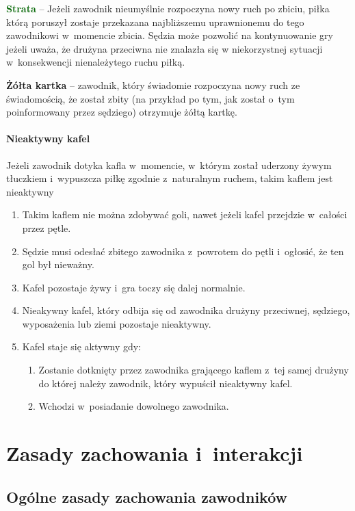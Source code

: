\documentclass[12pt]{article}
\newcommand\yellowcard[1]{\bgroup\textcolor{darkyellow}{\textbf{#1}}}
\newcommand\other[1]{\bgroup\textcolor{darkgreen}{\textbf{#1}}}
\begin{document}
\other{Strata} -- Jeżeli zawodnik nieumyślnie rozpoczyna nowy ruch po
zbiciu, piłka którą poruszył zostaje przekazana najbliższemu
uprawnionemu do tego zawodnikowi w~momencie zbicia. Sędzia może pozwolić
na kontynuowanie gry jeżeli uważa, że drużyna przeciwna nie znalazła się
w niekorzystnej sytuacji w~konsekwencji nienależytego ruchu piłką.

\yellowcard{Żółta kartka} -- zawodnik, który świadomie rozpoczyna nowy ruch ze
świadomością, że został zbity (na przykład po tym, jak został o~tym
poinformowany przez sędziego) otrzymuje żółtą kartkę.

\paragraph{Nieaktywny kafel}
Jeżeli zawodnik dotyka kafla w~momencie, w~którym został uderzony żywym tłuczkiem i~wypuszcza piłkę
zgodnie z~naturalnym ruchem, takim kaflem jest nieaktywny

\begin{enumerate}
	\item
	      Takim kaflem nie można zdobywać goli, nawet jeżeli kafel przejdzie w~całości przez pętle.
	\item
	      Sędzie musi odesłać zbitego zawodnika z~powrotem do pętli i~ogłosić,
	      że ten gol był nieważny.
	\item
	      Kafel pozostaje żywy i~gra toczy się dalej normalnie.
	\item
	      Nieakywny kafel, który odbija się od zawodnika drużyny przeciwnej,
	      sędziego, wyposażenia lub ziemi pozostaje nieaktywny.
	\item
	      Kafel staje się aktywny gdy:

	      \begin{enumerate}
		      \item
		            Zostanie dotknięty przez zawodnika grającego kaflem z~tej samej
		            drużyny do której należy zawodnik, który wypuścił nieaktywny kafel.
		      \item
		            Wchodzi w~posiadanie dowolnego zawodnika.
	      \end{enumerate}
\end{enumerate}

\pagebreak
\section{Zasady zachowania i~interakcji}

\subsection{Ogólne zasady zachowania zawodników}
\end{document}
